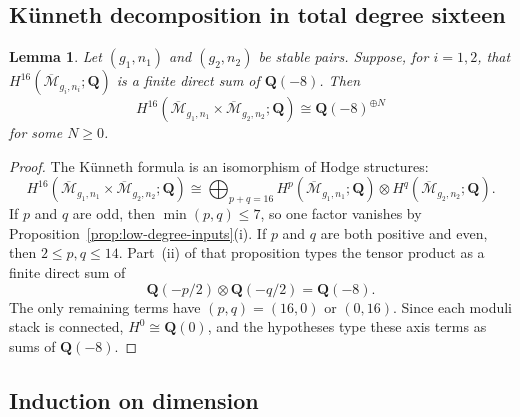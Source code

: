 \documentclass[12pt,reqno]{amsart}
\newcommand{\Q}{\mathbf{Q}}
\newcommand{\Mbar}{\overline{\mathcal{M}}}
\newtheorem{lemma}[theorem]{Lemma}
\theoremstyle{definition}
\theoremstyle{remark}
\begin{document}
\subsection{K\"unneth decomposition in total degree sixteen}

\begin{lemma}\label{lem:kunneth-sixteen}
Let $(g_1,n_1)$ and $(g_2,n_2)$ be stable pairs.  Suppose, for $i=1,2$,
that $H^{16}(\Mbar_{g_i,n_i};\Q)$ is a finite direct sum of $\Q(-8)$.
Then
\[
 H^{16}(\Mbar_{g_1,n_1}\times\Mbar_{g_2,n_2};\Q)
 \cong\Q(-8)^{\oplus N}
\]
for some $N\geq0$.
\end{lemma}

\begin{proof}
The K\"unneth formula is an isomorphism of Hodge structures:
\[
 H^{16}(\Mbar_{g_1,n_1}\times\Mbar_{g_2,n_2};\Q)
 \cong
 \bigoplus_{p+q=16}
 H^p(\Mbar_{g_1,n_1};\Q)
 \otimes H^q(\Mbar_{g_2,n_2};\Q).
\]
If $p$ and $q$ are odd, then $\min(p,q)\leq7$, so one factor vanishes by
Proposition~\ref{prop:low-degree-inputs}(i).  If $p$ and $q$ are both
positive and even, then $2\leq p,q\leq14$.  Part~(ii) of that proposition
types the tensor product as a finite direct sum of
\[
  \Q(-p/2)\otimes\Q(-q/2)=\Q(-8).
\]
The only remaining terms have $(p,q)=(16,0)$ or $(0,16)$.  Since each
moduli stack is connected, $H^0\cong\Q(0)$, and the hypotheses type these
axis terms as sums of $\Q(-8)$.
\end{proof}

\subsection{Induction on dimension}
\end{document}
